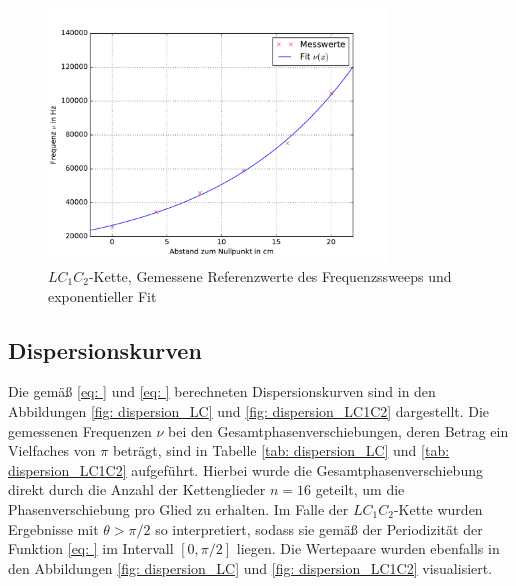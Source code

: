 \FloatBarrier
\begin{figure}
  \centering
  \includegraphics[width = 0.8\textwidth]{../Messdaten/plots/frequenzsweep_LC1C2.pdf}
  \caption{$LC_1C_2$-Kette, Gemessene Referenzwerte des Frequenzssweeps und exponentieller Fit}
  \label{fig: plot_sweep_LC1C2}
\end{figure}
\newpage
\subsection{Dispersionskurven}
Die gemäß \eqref{eq: } und \eqref{eq: } berechneten Dispersionskurven sind in den Abbildungen \ref{fig: dispersion_LC} und \ref{fig: dispersion_LC1C2}
dargestellt. Die gemessenen Frequenzen $\nu$ bei den Gesamtphasenverschiebungen, deren Betrag ein Vielfaches von $\pi$ beträgt,
sind in Tabelle \ref{tab: dispersion_LC} und \ref{tab: dispersion_LC1C2} aufgeführt. Hierbei wurde die Gesamtphasenverschiebung direkt durch die
Anzahl der Kettenglieder $n = 16$ geteilt, um die Phasenverschiebung pro Glied zu erhalten. Im Falle der $LC_1C_2$-Kette
wurden Ergebnisse mit $\theta > \pi/2$ so interpretiert, sodass sie gemäß der Periodizität der Funktion \eqref{eq: } im Intervall
$[0, \pi/2]$ liegen. Die Wertepaare wurden ebenfalls in den Abbildungen \ref{fig: dispersion_LC} und \ref{fig: dispersion_LC1C2} visualisiert.



